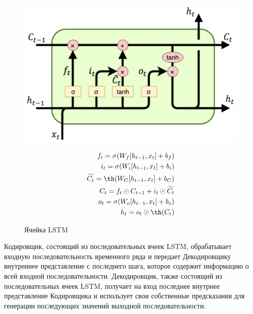 \begin{figure}[H]
    \centering
    \begin{minipage}{0.5\textwidth}
        \centering
        \includegraphics[width=\textwidth]{results/lstm_cell.jpg}
        \caption{Ячейка LSTM~\cite{LSTM3}}
        \label{lstm_cell}
    \end{minipage}
    \hfill
    \begin{minipage}{0.4\textwidth}  
        \begin{align*}
        f_{t} = \sigma (W_{f} [h_{t-1}, x_{t}] +b_{f}) \\
        i_{t} = \sigma (W_{i} [h_{t-1}, x_{t}] + b_{i}) \\
        \widetilde{C_{t}} = \th(W_{C} [h_{t-1}, x_{t}] + b_{C}) \\
        C_{t} = f_{t} \odot C_{t-1} + i_{t} \odot \widetilde{C_{t}} \\
        o_{t} = \sigma (W_{o} [h_{t-1}, x_{t}] + b_{o}) \\
        h_{t} = o_{t} \odot \th(C_{t})
        \end{align*}
    \end{minipage}
\end{figure}

Кодировщик, состоящий из последовательных ячеек LSTM, обрабатывает входную последовательность временного ряда и передает Декодировщику внутреннее представление с последнего шага, которое содержит информацию о всей входной последовательности. Декодировщик, также состоящий из последовательных ячеек LSTM, получает на вход последнее внутрнее представление Кодировщика и использует свои собственные предсказания для генерации последующих значений выходной последовательности.

